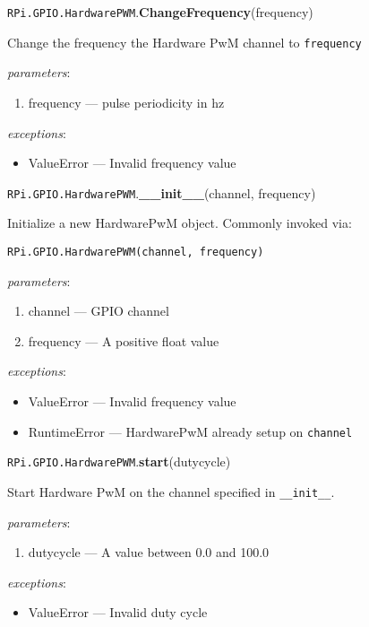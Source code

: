 \documentclass[12pt]{article}
\begin{document}
\noindent \texttt{RPi.GPIO.HardwarePWM}.\textbf{ChangeFrequency}(frequency)
        
Change the frequency the Hardware PwM channel to \texttt{frequency}
        
\textit{parameters}:
\begin{enumerate}      
        \item frequency --- pulse periodicity in hz
\end{enumerate}
 
 
\textit{exceptions}:
\begin{itemize}
    \item ValueError --- Invalid frequency value
\end{itemize}

\noindent \texttt{RPi.GPIO.HardwarePWM}.\textbf{\_\_init\_\_}(channel, frequency)
        
Initialize a new HardwarePwM object. Commonly invoked via:

\texttt{RPi.GPIO.HardwarePWM(channel, frequency)}

\textit{parameters}:
\begin{enumerate}
        \item channel --- GPIO channel
        \item frequency --- A positive float value
\end{enumerate}
 
 
\textit{exceptions}:
\begin{itemize}
    \item ValueError --- Invalid frequency value
    \item RuntimeError --- HardwarePwM already setup on \texttt{channel}
\end{itemize}

\noindent \texttt{RPi.GPIO.HardwarePWM}.\textbf{start}(dutycycle)
        
Start Hardware PwM on the channel specified in \texttt{\_\_init\_\_}.

\textit{parameters}:
\begin{enumerate}      
        \item dutycycle --- A value between 0.0 and 100.0
\end{enumerate}
 
 
\textit{exceptions}:
\begin{itemize}
    \item ValueError --- Invalid duty cycle
\end{itemize}
\end{document}
